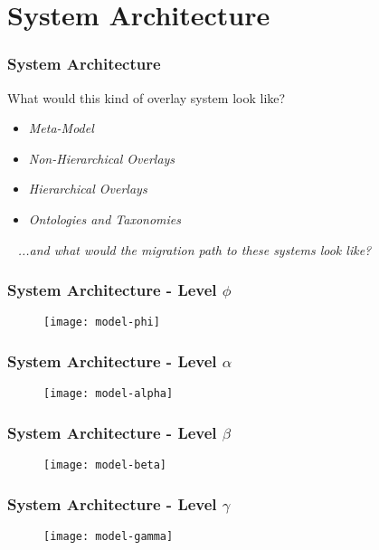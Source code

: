 \section{System Architecture}
\begin{frame}
\frametitle{System Architecture}
What would this kind of overlay system look like?
\begin{itemize}
\item<2-> \textit{Meta-Model}
\item<3-> \textit{Non-Hierarchical Overlays}
\item<4-> \textit{Hierarchical Overlays}
\item<5-> \textit{Ontologies and Taxonomies}
\end{itemize}
\
\newline
\newline
\pause
\textit{...and what would the migration path to these systems look like?}
\end{frame}

\begin{frame}[t]
\frametitle{System Architecture - Level $\phi$}
\begin{figure}[!t]
\centering
\texttt{[image: model-phi]}
\label{fig:model:phi}
\end{figure}
\end{frame}

\begin{frame}[t]
\frametitle{System Architecture - Level $\alpha$}
\begin{figure}[!t]
\centering
\texttt{[image: model-alpha]}
\label{fig:model:alpha}
\end{figure}
\end{frame}

\begin{frame}[t]
\frametitle{System Architecture - Level $\beta$}
\begin{figure}[!t]
\centering
\texttt{[image: model-beta]}
\label{fig:model:beta}
\end{figure}
\end{frame}

\begin{frame}[t]
\frametitle{System Architecture - Level $\gamma$}
\begin{figure}[!t]
\centering
\texttt{[image: model-gamma]}
\label{fig:model:gamma}
\end{figure}
\end{frame}

